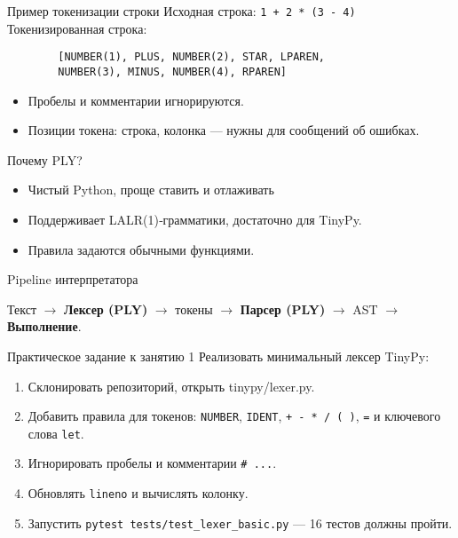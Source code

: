 \documentclass[aspectratio=169]{beamer}
\begin{document}
\begin{frame}[fragile]{Пример токенизации строки}
	Исходная строка: \texttt{1 + 2 * (3 - 4)} \newline
	Токенизированная строка:
	\begin{verbatim}
        [NUMBER(1), PLUS, NUMBER(2), STAR, LPAREN,
        NUMBER(3), MINUS, NUMBER(4), RPAREN]
    \end{verbatim}
	\begin{itemize}
		\item Пробелы и комментарии игнорируются.
		\item Позиции токена: строка, колонка — нужны для сообщений об ошибках.
	\end{itemize}
\end{frame}

\begin{frame}{Почему PLY?}
	\begin{itemize}
		\item Чистый Python, проще ставить и отлаживать
		\item Поддерживает LALR(1)‑грамматики, достаточно для TinyPy.
		\item Правила задаются обычными функциями.
	\end{itemize}
\end{frame}

\begin{frame}{Pipeline интерпретатора}
	\centering
	\begin{small}
		Текст $\rightarrow$ \textbf{Лексер (PLY)} $\rightarrow$ токены $\rightarrow$ \textbf{Парсер (PLY)} $\rightarrow$ AST $\rightarrow$ \textbf{Выполнение}.
	\end{small}
\end{frame}

\begin{frame}{Практическое задание к занятию 1}
	Реализовать минимальный лексер TinyPy:
	\begin{enumerate}
		\item Склонировать репозиторий, открыть tinypy/lexer.py.
		\item Добавить правила для токенов: \texttt{NUMBER}, \texttt{IDENT}, \texttt{+ - * / ( )}, \texttt{=} и ключевого слова \texttt{let}.
		\item Игнорировать пробелы и комментарии \texttt{\# ...}.
		\item Обновлять \texttt{lineno} и вычислять колонку.
		\item Запустить \texttt{pytest tests/test\_lexer\_basic.py} — 16 тестов должны пройти.
	\end{enumerate}
\end{frame}
\end{document}

